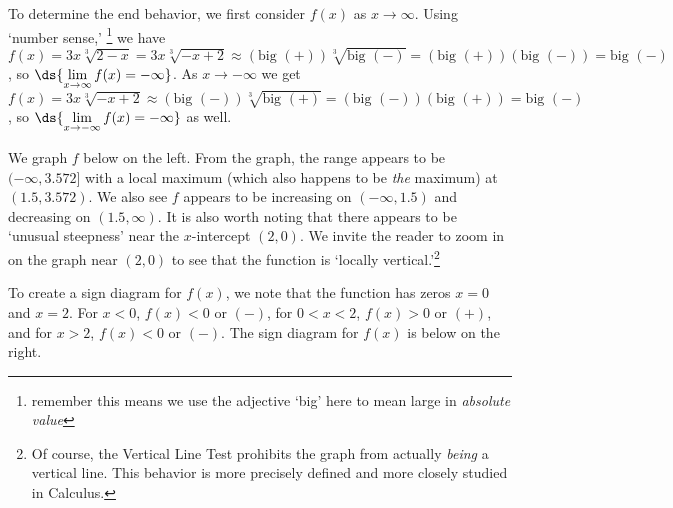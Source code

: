 \documentclass{ximera}
\begin{document}
\begin{example}
\begin{enumerate}
To determine the end behavior, we first consider $f(x)$ as $x \rightarrow  \infty$.  Using `number sense,' \footnote{remember this means we use the adjective `big' here to mean large in \textit{absolute value}} we have $f(x) = 3x \sqrt[3]{2-x} = 3x \sqrt[3]{-x+2} \approx (\text{big $(+)$}) \sqrt[3]{\text{big $(-)$}} = (\text{big $(+)$})(\text{big $(-)$}) = \text{big $(-)$}$, so $\ds{\lim_{x \rightarrow \infty} f(x) = -\infty}$.  As $x \rightarrow -\infty$ we get $f(x) = 3x \sqrt[3]{-x+2} \approx (\text{big $(-)$}) \sqrt[3]{\text{big $(+)$}} = (\text{big $(-)$})(\text{big $(+)$}) = \text{big $(-)$}$, so  $\ds{\lim_{x \rightarrow -\infty} f(x) = -\infty}$ as well.

We graph $f$ below on the left.  From the graph, the range appears to be $(-\infty, 3.572]$ with a local maximum (which also happens to be \textit{the} maximum) at $(1.5, 3.572)$.  We also see $f$ appears to be increasing on $(-\infty, 1.5)$ and decreasing on $(1.5, \infty)$.  It is also worth noting that there appears to be `unusual steepness' near the $x$-intercept $(2,0)$.  We invite the reader to zoom in on the graph near $(2,0)$ to see that the function is `locally vertical.'\footnote{Of course, the Vertical Line Test prohibits the graph from actually \textit{being} a vertical line.  This behavior is more precisely defined and more closely studied in Calculus.}

\smallskip

To create a sign diagram for $f(x)$, we note that the function has zeros $x = 0$ and $x=2$. For $x<0$, $f(x) < 0$ or $(-)$, for $0<x<2$, $f(x) > 0$ or $(+)$, and for $x>2$, $f(x) < 0$ or $(-)$. The sign diagram for $f(x)$ is below on the right. 

\begin{center}

% 
\end{center}

\begin{center}
\end{center}


\end{enumerate}
\end{example}
\end{document}
